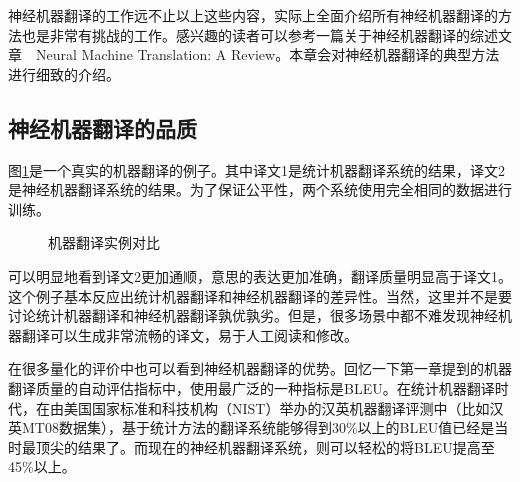 \parinterval  神经机器翻译的工作远不止以上这些内容，实际上全面介绍所有神经机器翻译的方法也是非常有挑战的工作。感兴趣的读者可以参考一篇关于神经机器翻译的综述文章\ \dash\ Neural Machine Translation: A Review\cite{StahlbergNeural}。本章会对神经机器翻译的典型方法进行细致的介绍。


\subsection{神经机器翻译的品质 }

\parinterval  图\ref{fig:6-2}是一个真实的机器翻译的例子。其中译文1是统计机器翻译系统的结果，译文2是神经机器翻译系统的结果。为了保证公平性，两个系统使用完全相同的数据进行训练。

\begin{figure}[htp]
\centering

\setlength{\abovecaptionskip}{-0.2cm}
\end{figure}

\begin{figure}[htp]
\centering

\setlength{\abovecaptionskip}{-0.2em}
\caption{机器翻译实例对比}
\label{fig:6-2}
\end{figure}
%

\vspace{-0.3em}
\parinterval  可以明显地看到译文2更加通顺，意思的表达更加准确，翻译质量明显高于译文1。这个例子基本反应出统计机器翻译和神经机器翻译的差异性。当然，这里并不是要讨论统计机器翻译和神经机器翻译孰优孰劣。但是，很多场景中都不难发现神经机器翻译可以生成非常流畅的译文，易于人工阅读和修改。

\parinterval  在很多量化的评价中也可以看到神经机器翻译的优势。回忆一下第一章提到的机器翻译质量的自动评估指标中，使用最广泛的一种指标是BLEU。在统计机器翻译时代，在由美国国家标准和科技机构（NIST）举办的汉英机器翻译评测中（比如汉英MT08数据集），基于统计方法的翻译系统能够得到30\%以上的BLEU值已经是当时最顶尖的结果了。而现在的神经机器翻译系统，则可以轻松的将BLEU提高至45\%以上。

